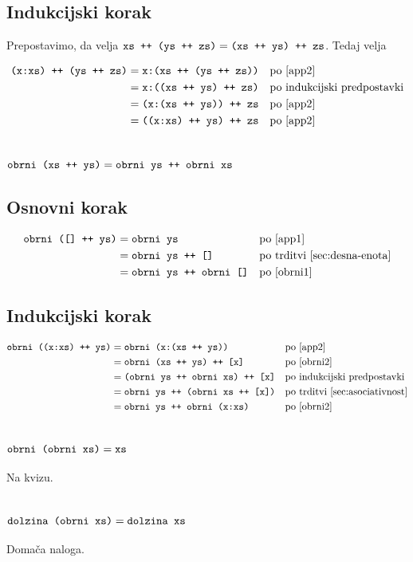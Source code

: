 \documentclass[11pt,a4paper]{article}
\begin{document}
\subsection*{Indukcijski korak}

Prepostavimo, da velja $\mbox{\texttt{xs ++ (ys ++ zs)}} = \mbox{\texttt{(xs ++ ys) ++ zs}}$. Tedaj velja

\begin{align*}
  \mbox{\texttt{(x:xs) ++ (ys ++ zs)}}
  &= \mbox{\texttt{x:(xs ++ (ys ++ zs))}}
    &&\text{po \eqref{app2}} \\
  &= \mbox{\texttt{x:((xs ++ ys) ++ zs)}}
    &&\text{po indukcijski predpostavki} \\
  &= \mbox{\texttt{(x:(xs ++ ys)) ++ zs}}
    &&\text{po \eqref{app2}} \\
  &= \mbox{\texttt{((x:xs) ++ ys) ++ zs}}
    &&\text{po \eqref{app2}}
\end{align*}


\section{$\mbox{\texttt{obrni (xs ++ ys)}} = \mbox{\texttt{obrni ys ++ obrni xs}}$}

\subsection*{Osnovni korak}

\begin{align*}
  \mbox{\texttt{obrni ([] ++ ys)}}
  &= \mbox{\texttt{obrni ys}}
    &&\text{po \eqref{app1}} \\
  &= \mbox{\texttt{obrni ys ++ []}}
    &&\text{po trditvi~\ref{sec:desna-enota}} \\
  &= \mbox{\texttt{obrni ys ++ obrni []}}
    &&\text{po \eqref{obrni1}}
\end{align*}

\subsection*{Indukcijski korak}

\begin{align*}
  \mbox{\texttt{obrni ((x:xs) ++ ys)}}
  &= \mbox{\texttt{obrni (x:(xs ++ ys))}}
    &&\text{po \eqref{app2}} \\
  &= \mbox{\texttt{obrni (xs ++ ys) ++ [x]}}
    &&\text{po \eqref{obrni2}} \\
  &= \mbox{\texttt{(obrni ys ++ obrni xs) ++ [x]}}
    &&\text{po indukcijski predpostavki} \\
  &= \mbox{\texttt{obrni ys ++ (obrni xs ++ [x])}}
    &&\text{po trditvi~\ref{sec:asociativnost}} \\
  &= \mbox{\texttt{obrni ys ++ obrni (x:xs)}}
    &&\text{po \eqref{obrni2}}
\end{align*}


\section{$\mbox{\texttt{obrni (obrni xs)}} = \mbox{\texttt{xs}}$}

Na kvizu.

\section{$\mbox{\texttt{dolzina (obrni xs)}} = \mbox{\texttt{dolzina xs}}$}

Domača naloga.
\end{document}
